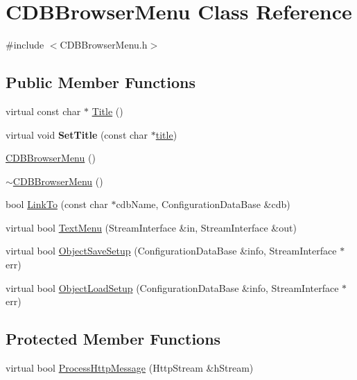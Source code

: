 \hypertarget{classCDBBrowserMenu}{
\section{CDBBrowserMenu Class Reference}
\label{classCDBBrowserMenu}
}


{\ttfamily \#include $<$CDBBrowserMenu.h$>$}

\subsection*{Public Member Functions}
\begin{DoxyCompactItemize}
\item 
virtual const char $\ast$ \hyperlink{classCDBBrowserMenu_a60b762702881e68c3e8e24cf6d2f8aa8}{Title} ()
\item 
\hypertarget{classCDBBrowserMenu_abdbb85ea44d7b6f93db922311a6401a3}{
virtual void {\bfseries SetTitle} (const char $\ast$\hyperlink{classCDBBrowserMenu_a398c0c3251532f4b924001c2b4fe3427}{title})}
\label{classCDBBrowserMenu_abdbb85ea44d7b6f93db922311a6401a3}

\item 
\hyperlink{classCDBBrowserMenu_abc789c1da32237b02438a1555e4f1e0b}{CDBBrowserMenu} ()
\item 
\hyperlink{classCDBBrowserMenu_a1b3621101f19a48ef37c213b0751393c}{$\sim$CDBBrowserMenu} ()
\item 
bool \hyperlink{classCDBBrowserMenu_aa81bfa7140426c04ce743cbe0a0f8bf5}{LinkTo} (const char $\ast$cdbName, ConfigurationDataBase \&cdb)
\item 
virtual bool \hyperlink{classCDBBrowserMenu_a9c5c708189ef3f7cc9d5131a0e38006e}{TextMenu} (StreamInterface \&in, StreamInterface \&out)
\item 
virtual bool \hyperlink{classCDBBrowserMenu_a8c8b793d08fd4e836fd8f9f54faf1e8e}{ObjectSaveSetup} (ConfigurationDataBase \&info, StreamInterface $\ast$err)
\item 
virtual bool \hyperlink{classCDBBrowserMenu_a7284f261814bba2876c344495ff89475}{ObjectLoadSetup} (ConfigurationDataBase \&info, StreamInterface $\ast$err)
\end{DoxyCompactItemize}
\subsection*{Protected Member Functions}
\begin{DoxyCompactItemize}
\item 
virtual bool \hyperlink{classCDBBrowserMenu_a70984d895ae73fb90e3886cd6467bd8c}{ProcessHttpMessage} (HttpStream \&hStream)
\end{DoxyCompactItemize}

